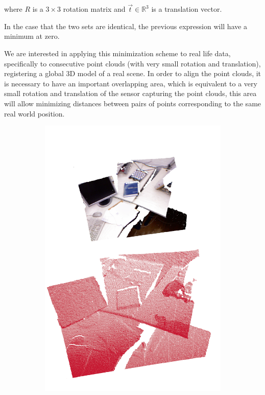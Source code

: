 \noindent where $R$ is a  $3\times3$ rotation matrix and $\vec{t} \in \mathbb{R}^3$ is a translation vector.


In the case that the two sets are identical, the previous expression will have a minimum at zero.

We are interested in applying this minimization scheme to real life data, specifically to consecutive 
point clouds (with very small rotation and translation), registering a global 3D model of 
a real scene. In order to align the point clouds, it is necessary to have an important overlapping 
area, which is equivalent to a very small rotation and translation of the sensor capturing the point clouds, 
this area will allow minimizing distances between pairs of points corresponding to the same real world position.


\begin{figure}[H]
\begin{subfigure}[b]{0.5\textwidth}
\includegraphics[scale=0.3]{images/two_clouds_1}

\end{subfigure}
\end{figure}

